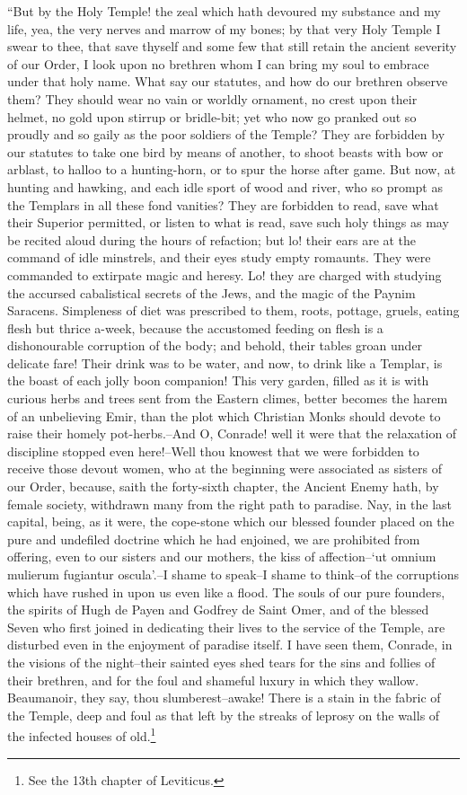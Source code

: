 ``But by the Holy Temple! the zeal which hath devoured my substance and
my life, yea, the very nerves and marrow of my bones; by that very Holy
Temple I swear to thee, that save thyself and some few that still retain
the ancient severity of our Order, I look upon no brethren whom I can
bring my soul to embrace under that holy name. What say our statutes,
and how do our brethren observe them? They should wear no vain or
worldly ornament, no crest upon their helmet, no gold upon stirrup or
bridle-bit; yet who now go pranked out so proudly and so gaily as the
poor soldiers of the Temple? They are forbidden by our statutes to take
one bird by means of another, to shoot beasts with bow or arblast, to
halloo to a hunting-horn, or to spur the horse after game. But now, at
hunting and hawking, and each idle sport of wood and river, who so
prompt as the Templars in all these fond vanities? They are forbidden to
read, save what their Superior permitted, or listen to what is read,
save such holy things as may be recited aloud during the hours of
refaction; but lo! their ears are at the command of idle minstrels, and
their eyes study empty romaunts. They were commanded to extirpate magic
and heresy. Lo! they are charged with studying the accursed cabalistical
secrets of the Jews, and the magic of the Paynim Saracens. Simpleness of
diet was prescribed to them, roots, pottage, gruels, eating flesh but
thrice a-week, because the accustomed feeding on flesh is a
dishonourable corruption of the body; and behold, their tables groan
under delicate fare! Their drink was to be water, and now, to drink like
a Templar, is the boast of each jolly boon companion! This very garden,
filled as it is with curious herbs and trees sent from the Eastern
climes, better becomes the harem of an unbelieving Emir, than the plot
which Christian Monks should devote to raise their homely
pot-herbs.--And O, Conrade! well it were that the relaxation of
discipline stopped even here!--Well thou knowest that we were forbidden
to receive those devout women, who at the beginning were associated as
sisters of our Order, because, saith the forty-sixth chapter, the
Ancient Enemy hath, by female society, withdrawn many from the right
path to paradise. Nay, in the last capital, being, as it were, the
cope-stone which our blessed founder placed on the pure and undefiled
doctrine which he had enjoined, we are prohibited from offering, even to
our sisters and our mothers, the kiss of affection--`ut omnium mulierum
fugiantur oscula'.--I shame to speak--I shame to think--of the
corruptions which have rushed in upon us even like a flood. The souls of
our pure founders, the spirits of Hugh de Payen and Godfrey de Saint
Omer, and of the blessed Seven who first joined in dedicating their
lives to the service of the Temple, are disturbed even in the enjoyment
of paradise itself. I have seen them, Conrade, in the visions of the
night--their sainted eyes shed tears for the sins and follies of their
brethren, and for the foul and shameful luxury in which they wallow.
Beaumanoir, they say, thou slumberest--awake! There is a stain in the
fabric of the Temple, deep and foul as that left by the streaks of
leprosy on the walls of the infected houses of old.\footnote{See the 13th
chapter of Leviticus.}

